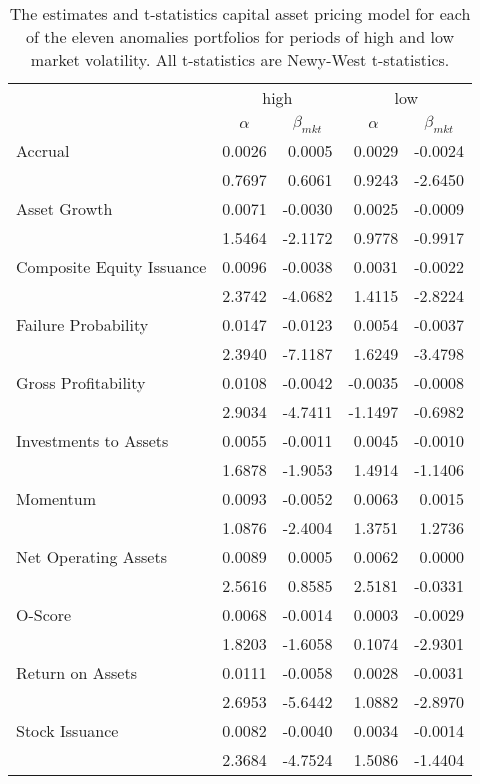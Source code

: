 
\begin{table}[]
    \caption{\newline The estimates and t-statistics capital asset pricing model for each of the eleven anomalies portfolios for periods of high and low market volatility. All t-statistics are Newy-West t-statistics.}
    \label{tab:vol-capm}
    \begin{tabular}{@{}lrrrr@{}}
    \toprule
     & \multicolumn{2}{c}{high} & \multicolumn{2}{c}{low} \\ \cmidrule(l){2-5} 
     & \multicolumn{1}{c}{$\alpha$} & \multicolumn{1}{c}{$\beta_{mkt}$} & \multicolumn{1}{c}{$\alpha$} & \multicolumn{1}{c}{$\beta_{mkt}$} \\ \midrule
    Accrual & 0.0026 & 0.0005 & 0.0029 & -0.0024 \\
     & 0.7697 & 0.6061 & 0.9243 & -2.6450 \\
    Asset Growth & 0.0071 & -0.0030 & 0.0025 & -0.0009 \\
     & 1.5464 & -2.1172 & 0.9778 & -0.9917 \\
    Composite Equity Issuance & 0.0096 & -0.0038 & 0.0031 & -0.0022 \\
     & 2.3742 & -4.0682 & 1.4115 & -2.8224 \\
    Failure Probability & 0.0147 & -0.0123 & 0.0054 & -0.0037 \\
     & 2.3940 & -7.1187 & 1.6249 & -3.4798 \\
    Gross Profitability & 0.0108 & -0.0042 & -0.0035 & -0.0008 \\
     & 2.9034 & -4.7411 & -1.1497 & -0.6982 \\
    Investments to Assets & 0.0055 & -0.0011 & 0.0045 & -0.0010 \\
     & 1.6878 & -1.9053 & 1.4914 & -1.1406 \\
    Momentum & 0.0093 & -0.0052 & 0.0063 & 0.0015 \\
     & 1.0876 & -2.4004 & 1.3751 & 1.2736 \\
    Net Operating Assets & 0.0089 & 0.0005 & 0.0062 & 0.0000 \\
     & 2.5616 & 0.8585 & 2.5181 & -0.0331 \\
    O-Score & 0.0068 & -0.0014 & 0.0003 & -0.0029 \\
     & 1.8203 & -1.6058 & 0.1074 & -2.9301 \\
    Return on Assets & 0.0111 & -0.0058 & 0.0028 & -0.0031 \\
     & 2.6953 & -5.6442 & 1.0882 & -2.8970 \\
    Stock Issuance & 0.0082 & -0.0040 & 0.0034 & -0.0014 \\
     & 2.3684 & -4.7524 & 1.5086 & -1.4404 \\ \bottomrule
    \end{tabular}
    \end{table}

